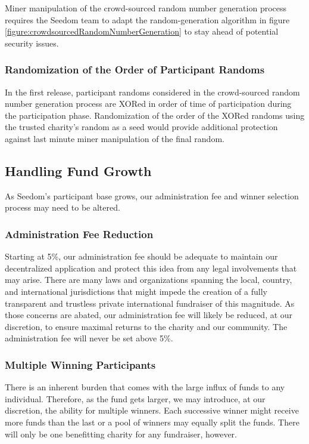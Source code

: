 \documentclass[11pt]{article}
\begin{document}
Miner manipulation of the crowd-sourced random number generation process requires the Seedom team to adapt the random-generation algorithm in figure \ref{figure:crowdsourcedRandomNumberGeneration} to stay ahead of potential security issues.

\subsubsection{Randomization of the Order of Participant Randoms}

In the first release, participant randoms considered in the crowd-sourced random number generation process are XORed in order of time of participation during the participation phase. Randomization of the order of the XORed randoms using the trusted charity's random as a seed would provide additional protection against last minute miner manipulation of the final random.

\subsection{Handling Fund Growth}

As Seedom's participant base grows, our administration fee and winner selection process may need to be altered.

\subsubsection{Administration Fee Reduction}

Starting at 5\%, our administration fee should be adequate to maintain our decentralized application and protect this idea from any legal involvements that may arise. There are many laws and organizations spanning the local, country, and international jurisdictions that might impede the creation of a fully transparent and trustless private international fundraiser of this magnitude. As those concerns are abated, our administration fee will likely be reduced, at our discretion, to ensure maximal returns to the charity and our community. The administration fee will never be set above 5\%.

\subsubsection{Multiple Winning Participants}

There is an inherent burden that comes with the large influx of funds to any individual. Therefore, as the fund gets larger, we may introduce, at our discretion, the ability for multiple winners. Each successive winner might receive more funds than the last or a pool of winners may equally split the funds. There will only be one benefitting charity for any fundraiser, however.
\end{document}
